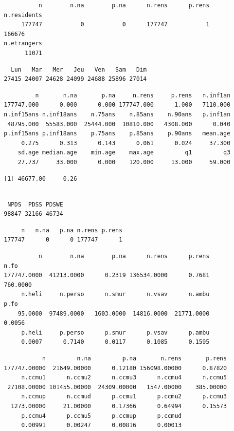 \documentclass[]{article}
\begin{document}
\begin{verbatim}
          n        n.na        p.na      n.rens      p.rens n.residents 
     177747           0           0      177747           1      166676 
n.etrangers 
      11071 
\end{verbatim}

\begin{verbatim}
  Lun   Mar   Mer   Jeu   Ven   Sam   Dim 
27415 24007 24628 24099 24688 25896 27014 
\end{verbatim}

\begin{verbatim}
         n       n.na       p.na     n.rens     p.rens   n.inf1an 
177747.000      0.000      0.000 177747.000      1.000   7110.000 
n.inf15ans n.inf18ans    n.75ans    n.85ans    n.90ans   p.inf1an 
 48795.000  55583.000  25444.000  10810.000   4308.000      0.040 
p.inf15ans p.inf18ans    p.75ans    p.85ans    p.90ans   mean.age 
     0.275      0.313      0.143      0.061      0.024     37.300 
    sd.age median.age    min.age    max.age         q1         q3 
    27.737     33.000      0.000    120.000     13.000     59.000 
\end{verbatim}

\begin{verbatim}
[1] 46677.00     0.26
\end{verbatim}

\begin{verbatim}

 NPDS  PDSS PDSWE 
98847 32166 46734 
\end{verbatim}

\begin{verbatim}
     n   n.na   p.na n.rens p.rens 
177747      0      0 177747      1 
\end{verbatim}

\begin{verbatim}
          n        n.na        p.na      n.rens      p.rens        n.fo 
177747.0000  41213.0000      0.2319 136534.0000      0.7681    760.0000 
     n.heli     n.perso      n.smur      n.vsav      n.ambu        p.fo 
    95.0000  97489.0000   1603.0000  14816.0000  21771.0000      0.0056 
     p.heli     p.perso      p.smur      p.vsav      p.ambu 
     0.0007      0.7140      0.0117      0.1085      0.1595 
\end{verbatim}

\begin{verbatim}
           n         n.na         p.na       n.rens       p.rens 
177747.00000  21649.00000      0.12180 156098.00000      0.87820 
     n.ccmu1      n.ccmu2      n.ccmu3      n.ccmu4      n.ccmu5 
 27108.00000 101455.00000  24309.00000   1547.00000    385.00000 
     n.ccmup      n.ccmud      p.ccmu1      p.ccmu2      p.ccmu3 
  1273.00000     21.00000      0.17366      0.64994      0.15573 
     p.ccmu4      p.ccmu5      p.ccmup      p.ccmud 
     0.00991      0.00247      0.00816      0.00013 
\end{verbatim}
\end{document}
